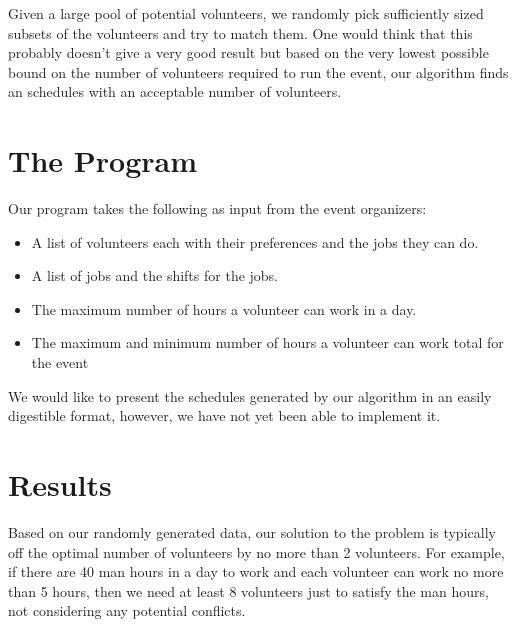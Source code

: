 \documentclass[12pt]{article}
\theoremstyle{definition}
\begin{document}
\begin{multicols}{2}
Given a large pool of potential volunteers, we randomly pick sufficiently sized subsets of the volunteers and try to match them.
One would think that this probably doesn't give a very good result but based on the very lowest possible bound on the number of volunteers required to run the event, our algorithm finds an schedules with an acceptable number of volunteers.

\section{The Program}
Our program takes the following as input from the event organizers:
\begin{itemize}
\item A list of volunteers each with their preferences and the jobs they can do.
\item A list of jobs and the shifts for the jobs.
\item The maximum number of hours a volunteer can work in a day.
\item The maximum and minimum number of hours a volunteer can work total for the event
\end{itemize}

We would like to present the schedules generated by our algorithm in an easily digestible format, however, we have not yet been able to implement it.

\section{Results}
Based on our randomly generated data, our solution to the problem is typically off the optimal number of volunteers by no more than 2 volunteers.
For example, if there are 40 man hours in a day to work and each volunteer can work no more than 5 hours, then we need at least 8 volunteers just to satisfy the man hours, not considering any potential conflicts.


\end{multicols}
\end{document}
